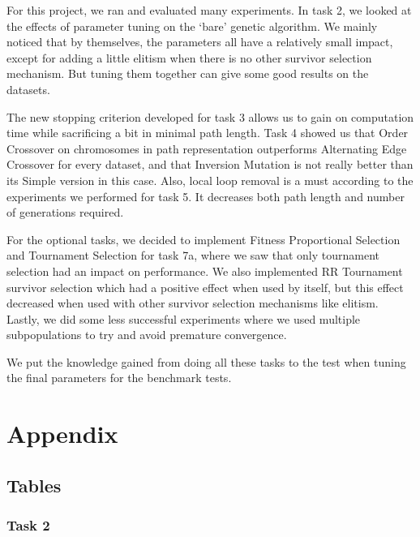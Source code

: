 \documentclass{report}
\newcommand{\mychapter}[2]{
    \setcounter{chapter}{#1}
    \setcounter{section}{0}
    \chapter*{#2}
    \addcontentsline{toc}{chapter}{#2}
}
\begin{document}
For this project, we ran and evaluated many experiments. In task 2, we looked at the effects of parameter tuning on the `bare' genetic algorithm. We mainly noticed that by themselves, the parameters all have a relatively small impact, except for adding a little elitism when there is no other survivor selection mechanism. But tuning them together can give some good results on the datasets.

The new stopping criterion developed for task 3 allows us to gain on computation time while sacrificing a bit in minimal path length. Task 4 showed us that Order Crossover on chromosomes in path representation outperforms Alternating Edge Crossover for every dataset, and that Inversion Mutation is not really better than its Simple version in this case. Also, local loop removal is a must according to the experiments we performed for task 5. It decreases both path length and number of generations required.

For the optional tasks, we decided to implement Fitness Proportional Selection and Tournament Selection for task 7a, where we saw that only tournament selection had an impact on performance. We also implemented RR Tournament survivor selection which had a positive effect when used by itself, but this effect decreased when used with other survivor selection mechanisms like elitism. Lastly, we did some less successful experiments where we used multiple subpopulations to try and avoid premature convergence.

We put the knowledge gained from doing all these tasks to the test when tuning the final parameters for the benchmark tests.


\mychapter{4}{Appendix}
\section{Tables}
\subsection{Task 2}
\label{app:task2}





\end{document}
